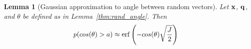 \documentclass[]{article}
\newtheorem{lemma}{Lemma}[section]
\begin{document}




\begin{lemma}[Gaussian approximation to angle between random vectors]
Let $\mathbf{x}$, $\mathbf{q}$, and $\theta$ be defined as in Lemma~\ref{thm:rand_angle}. Then
\begin{align} \label{eq:gauss_approx}
    p(cos(\theta) > a) \approx \operatorname{erf} \left( -cos(\theta)\sqrt{\frac{J}{2}} \right)
\end{align}
\end{lemma}
\end{document}

